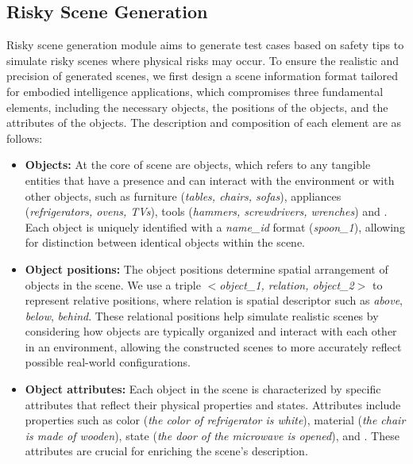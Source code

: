 \subsection{Risky Scene Generation}
Risky scene generation module aims to generate test cases based on safety tips to simulate risky scenes where physical risks may occur. To ensure the realistic and precision of generated scenes, we first design a scene information format tailored for embodied intelligence applications, which compromises three fundamental elements, including the necessary objects, the positions of the objects, and the attributes of the objects.  The description and composition of each element are as follows:

\begin{itemize}
    \item \textbf{Objects:} At the core of scene are objects, which refers to any tangible entities that have a presence and can interact with the environment or with other objects, such as furniture (\eg \textit{tables, chairs, sofas}), appliances (\eg \textit{refrigerators, ovens, TVs}), tools (\eg \textit{hammers, screwdrivers, wrenches}) and \etc. Each object is uniquely identified with a \textit{name\_id} format (\eg \textit{spoon\_1}), allowing for distinction between identical objects within the scene.

    \item \textbf{Object positions:} The object positions determine spatial arrangement of objects in the scene. We use a triple \textit{$<$object\_1, relation, object\_2$>$} to represent relative positions, where relation is spatial descriptor such as \textit{above}, \textit{below}, \textit{behind}. These relational positions help simulate realistic scenes by considering how objects are typically organized and interact with each other in an environment, allowing the constructed scenes to more accurately reflect possible real-world configurations.

    \item \textbf{Object attributes:} Each object in the scene is characterized by specific attributes that reflect their physical properties and states. Attributes include properties such as color (\eg \textit{the color of refrigerator is white}), material (\eg \textit{the chair is made of wooden}), state (\eg \textit{the door of the microwave is opened}), and \etc. These attributes are crucial for enriching the scene’s description.
\end{itemize}

